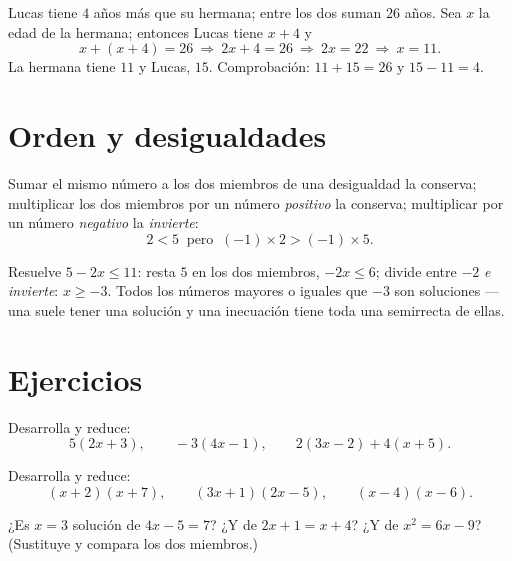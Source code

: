 \begin{example}\label{ex:g8:equations:problem}
Lucas tiene $4$ años más que su hermana; entre los dos suman
$26$ años. Sea $x$ la edad de la hermana; entonces Lucas tiene $x + 4$ y
\[
x + (x + 4) = 26
\ \Longrightarrow\
2x + 4 = 26
\ \Longrightarrow\
2x = 22
\ \Longrightarrow\
x = 11 .
\]
La hermana tiene $11$ y Lucas, $15$. Comprobación: $11 + 15 = 26$ y
$15 - 11 = 4$.
\end{example}

\section{Orden y desigualdades}

\begin{proposition}\label{prop:g8:equations:order}
Sumar el mismo número a los dos miembros de una desigualdad la conserva;
multiplicar los dos miembros por un número \emph{positivo} la conserva;
multiplicar por un número \emph{negativo} la \emph{invierte}:
\[
2 < 5 \ \text{ pero }\ (-1) \times 2 > (-1) \times 5 .
\]
\end{proposition}
\admitted

\begin{example}\label{ex:g8:equations:inequality}
Resuelve $5 - 2x \leq 11$: resta $5$ en los dos miembros, $-2x \leq 6$;
divide entre $-2$ \emph{e invierte}: $x \geq -3$. Todos los números
mayores o iguales que $-3$ son soluciones --- una  suele
tener una solución y una inecuación tiene toda una semirrecta de ellas.
\end{example}

\section{Ejercicios}

\begin{exercise}[$\star$]\label{exo:g8:equations:1}
Desarrolla y reduce:
\[
5(2x + 3), \qquad
-3(4x - 1), \qquad
2(3x - 2) + 4(x + 5).
\]
\end{exercise}

\begin{exercise}[$\star$]\label{exo:g8:equations:2}
Desarrolla y reduce:
\[
(x + 2)(x + 7), \qquad
(3x + 1)(2x - 5), \qquad
(x - 4)(x - 6).
\]
\end{exercise}

\begin{exercise}[$\star$]\label{exo:g8:equations:3}
¿Es $x = 3$ solución de $4x - 5 = 7$? ¿Y de $2x + 1 = x + 4$? ¿Y de
$x^2 = 6x - 9$? (Sustituye y compara los dos miembros.)
\end{exercise}


